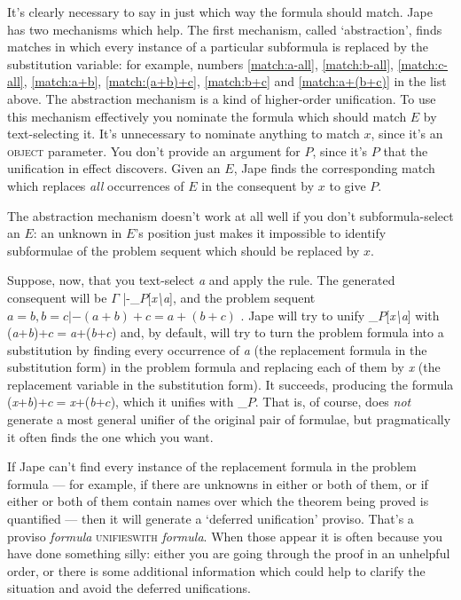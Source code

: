 It's clearly necessary to say in just which way the formula should match. Jape has two mechanisms which help. The first mechanism, called `abstraction', finds matches in which every instance of a particular subformula is replaced by the substitution variable: for example, numbers \ref{match:a-all}, \ref{match:b-all}, \ref{match:c-all}, \ref{match:a+b}, \ref{match:(a+b)+c}, \ref{match:b+c} and \ref{match:a+(b+c)} in the list above. The abstraction mechanism is a kind of higher-order unification. To use this mechanism effectively you nominate the formula which should match $E$ by text-selecting it. It's unnecessary to nominate anything to match $x$, since it's an \textsc{object} parameter. You don't provide an argument for $P$, since it's $P$ that the unification in effect discovers. Given an $E$, Jape finds the corresponding match which replaces \emph{all} occurrences of $E$ in the consequent by $x$ to give $P$.

The abstraction mechanism doesn't work at all well if you don't subformula-select an $E$: an unknown in $E$'s position just makes it impossible to identify subformulae of the problem sequent which should be replaced by $x$.

Suppose, now, that you text-select \textit{a} and apply the rule. The generated consequent will be $\Gamma$ |-\_$P$[\textit{x{\textbackslash}a}], and the problem sequent $a=b,b=c |- (a+b)+c=a+(b+c)$ . Jape will try to unify \_$P$[\textit{x{\textbackslash}a}] with (\textit{a}+\textit{b})+$c$\ensuremath{=}\textit{a}+(\textit{b}+$c$) and, by default, will try to turn the problem formula into a substitution by finding every occurrence of \textit{a} (the replacement formula in the substitution form) in the problem formula and replacing each of them by \textit{x} (the replacement variable in the substitution form). It succeeds, producing the formula (\textit{x}+\textit{b})+$c$\ensuremath{=}\textit{x}+(\textit{b}+$c$), which it unifies with \_$P$. That is, of course, does \textit{not} generate a most general unifier of the original pair of formulae, but pragmatically it often finds the one which you want.

If Jape can't find every instance of the replacement formula in the problem formula --- for example, if there are unknowns in either or both of them, or if either or both of them contain names over which the theorem being proved is quantified --- then it will generate a `deferred unification' proviso. That's a proviso \textit{formula} \textsc{unifieswith} \textit{formula}. When those appear it is often because you have done something silly: either you are going through the proof in an unhelpful order, or there is some additional information which could help to clarify the situation and avoid the deferred unifications.

